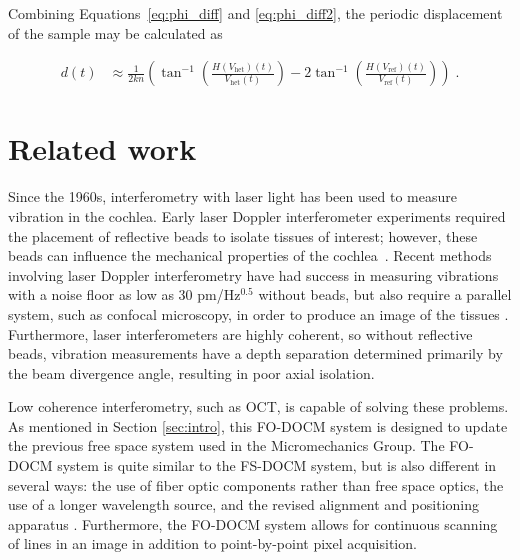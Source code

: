 Combining Equations~\ref{eq:phi_diff} and \ref{eq:phi_diff2}, the periodic displacement of the sample may be calculated as

\begin{equation}
\begin{aligned}
 d(t)  & \approx \frac{1}{2kn} \left( \tan^{-1}\left( \frac{H(V_{\mathrm{het}})(t)}{V_{\mathrm{het}}(t)} \right) - 2\tan^{-1}\left( \frac{H(V_{\mathrm{ref}})(t)}{V_{\mathrm{ref}}(t)} \right) \right) \; .
\end{aligned}
\end{equation}

\section{Related work}

Since the 1960s, interferometry with laser light has been used to measure vibration in the cochlea. Early laser Doppler interferometer experiments required the placement of reflective beads to isolate tissues of interest; however, these beads can influence the mechanical properties of the cochlea~\cite{Nuttall2012}. Recent methods involving laser Doppler interferometry have had success in measuring vibrations with a noise floor as low as 30 pm/Hz$^{0.5}$ without beads, but also require a parallel system, such as confocal microscopy, in order to produce an image of the tissues \cite{Jacob2009} \cite{Ren2002} \cite{Ren2011} . Furthermore, laser interferometers are highly coherent, so without reflective beads, vibration measurements have a depth separation determined primarily by the beam divergence angle, resulting in poor axial isolation.

Low coherence interferometry, such as OCT, is capable of solving these problems. As mentioned in Section \ref{sec:intro}, this FO-DOCM system is designed to update the previous free space system used in the Micromechanics Group. The FO-DOCM system is quite similar to the FS-DOCM system, but is also different in several ways: the use of fiber optic components rather than free space optics, the use of a longer wavelength source, and the revised alignment and positioning apparatus  \cite{hong}. Furthermore, the FO-DOCM system allows for continuous scanning of lines in an image in addition to point-by-point pixel acquisition.

